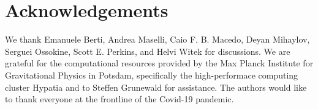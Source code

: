 \documentclass[twocolumn,
               prd,
               aps,
               superscriptaddress,
               tightenlines,
               nofootinbib,
               eqsecnum,
               amsfonts,
               amsmath,
               longbibliography]{revtex4-1}
\begin{document}
\section*{Acknowledgements}
\label{sec:acknowledgements}
%
We thank Emanuele Berti, Andrea Maselli, Caio F. B. Macedo, Deyan Mihaylov,
Serguei Ossokine, Scott E. Perkins, and Helvi Witek for discussions.
%
We are grateful for the computational resources provided by the Max Planck
Institute for Gravitational Physics in Potsdam, specifically the
high-performace computing cluster Hypatia and to Steffen Grunewald for
assistance.
%
The authors would like to thank everyone at the frontline of the Covid-19
pandemic.

% 

\end{document}
